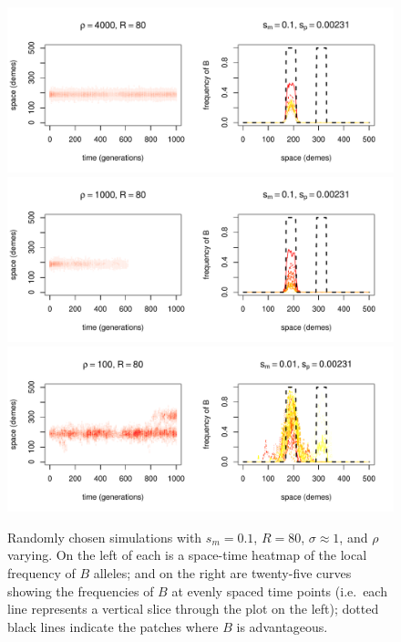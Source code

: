 \documentclass{article}
\begin{document}
\begin{figure}
  \begin{center}
    \includegraphics{example-migration-sims/89826-r1-501-sb0_01-sm-0_1-N4000-pophistory-run}
    \includegraphics{example-migration-sims/76178-r1-501-sb0_01-sm-0_1-N1000-pophistory-run}
    \includegraphics{example-migration-sims/97545-r1-501-sb0_01-sm-0_01-N100-pophistory-run}
  \end{center}
  \caption{
    Randomly chosen simulations with $s_m=0.1$, $R=80$, $\sigma\approx 1$, and $\rho$ varying.
    On the left of each is a space-time heatmap of the local frequency of $B$ alleles;
    and on the right are twenty-five curves showing the frequencies of $B$ at evenly spaced time points
    (i.e.\ each line represents a vertical slice through the plot on the left);
    dotted black lines indicate the patches where $B$ is advantageous.
  } \label{sfig:sims_5}
\end{figure}
\end{document}
